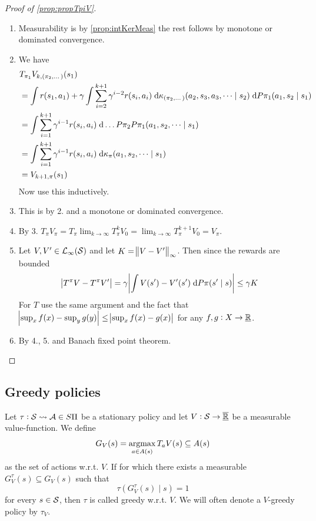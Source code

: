 \begin{proof}[Proof of \cref{prop:propTpiV}]
  \leavevmode
  \begin{enumerate}
    \item Measurability is by \cref{prop:intKerMeas} the rest follows by
      monotone or dominated convergence.
      \label{commLimits}
    \item We have
      \begin{align*}
	&T_{\pi_1} V_{k,(\pi_2, \dots)}(s_1)
	\\ &= \int r(s_1, a_1) + \gamma
	\int \sum_{i=2}^{k+1} \gamma^{i-2} r(s_i, a_i)
	\; \mathrm{d} \kappa_{(\pi_2, \dots)} (a_2, s_3, a_3, \dots \mid s_2)
	\; \mathrm{d} P \pi_1(a_1, s_2 \mid s_1)
	\\ &= \int \sum_{i=1}^{k+1} \gamma^{i-1} r(s_i, a_i)
	\; \mathrm{d} \dots P \pi_2 P \pi_1 (a_1, s_2, \dots \mid s_1)
	\\ &= \int \sum_{i=1}^{k+1} \gamma^{i-1} r(s_i, a_i)
	\; \mathrm{d} \kappa_\pi (a_1, s_2, \dots \mid s_1)
	\\ &= V_{k+1, \pi}(s_1)
      \end{align*}
      Now use this inductively.
    \item This is by 2. and a monotone or dominated convergence.
    \item By 3. $T_\pi V_\pi = T_\pi \lim_{k \to\infty} T_{\pi}^k V_0
      = \lim_{k \to\infty} T_\pi^{k+1} V_0 = V_\pi$.
    \item Let $V, V' \in \mathcal{L}_\infty(\mathcal{S})$
      and let $K = \norm{V - V'}_\infty$.
      Then since the rewards are bounded
      \[ \abs{T^\pi V - T^\pi V'}
	= \gamma \abs{\int V(s') - V'(s') \; \mathrm{d} P\pi(s' \mid s)}
      \leq \gamma K \]
      For $T$ use the same argument and the fact that
      $\abs{\sup_x f(x) - \sup_{y} g(y)} \leq
      \abs{\sup_x f(x) - g(x)}$ for any $f,g : X \to \underline{\mathbb{R}}$.
    \item By 4., 5. and Banach fixed point theorem.
  \end{enumerate}
\end{proof}

\subsection{Greedy policies}

\begin{defn}
  Let $\tau : \mathcal{S} \leadsto \mathcal{A} \in S\Pi$ be a stationary policy and
  let $V : \mathcal{S} \to \overline{\underline{\mathbb{R}}}$ be a measurable value-function.
  We define
  \[ G_V(s) = \operatorname*{argmax}_{a \in A(s)} T_a V(s) \subseteq A(s) \]
  as the set of  actions w.r.t. $V$.
  If for which there exists a measurable $G_V^\tau(s) \subseteq G_V(s)$
  such that
  \[ \tau(G_V^\tau(s) \mid s) = 1 \]
  for every $s \in \mathcal{S}$, then $\tau$ is called greedy w.r.t. $V$.
  We will often denote a $V$-greedy policy by $\tau_V$.
\end{defn}

